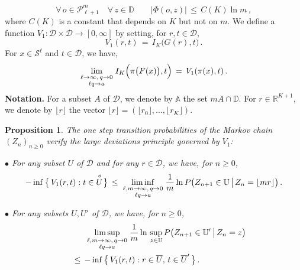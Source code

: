 \documentclass[a4paper,12pt]{article}
\newtheorem{proposition}[theorem]{Proposition}
\theoremstyle{definition}
\theoremstyle{remark}
\def \cD {\mathcal{D}}
\def \cP {\mathcal{P}}
\def \cS {\mathcal{S}}
\def \A {\mathbb{A}}
\def \dD {\mathbb{D}}
\def \R {\mathbb{R}}
\def \dU {\mathbb{U}}
\def \Zt {(Z_n)_{n\geq 0}}
\def \pml {\cP^m_{\ell +1}}
\def\uro{\smash{{U}^{\!\!\!\!\raise5pt\hbox{$\scriptstyle o$}}}}
\begin{document}
$$\forall\, o\in\pml\quad \forall\, z\in\dD\qquad
\big|\Phi(o,z)\big|\,\leq\, C(K)\ln m\,,$$
where
$C(K)$
is a constant that depends on $K$ but not on $m$.
We define a function
$V_1:\cD\times\cD\to [0,\infty]$
by setting, for
$r,t\in\cD$,
$$V_1(r,t)\,=\,
I_K\big(
G(r),t
\big)
\,.$$ 
For $x\in\cS^\ell$ and $t\in\cD$, we have,
$$\lim_{\genfrac{}{}{0pt}{1}{\ell\to\infty,\,q\to0}{\ell q\to a}}
I_K\Big(\pi\big(F(x) \big),t\Big)\,=\,V_1(\pi(x),t)\,.$$
\textbf{Notation.} For a subset $A$ of $\cD$,
we denote by $\A$ the set $mA\cap\dD$.
For $r\in\R^{K+1}$,
we denote by $\lfloor r \rfloor$
the vector 
$\lfloor r\rfloor=(\lfloor r_0\rfloor,\dots,\lfloor r_K\rfloor)$.
\begin{proposition}\label{pgdtrans1}
The one step transition probabilities of the Markov chain  
$\Zt$
verify the large deviations principle governed by
$V_1$:

$\bullet$ For any subset $U$ of $\cD$ and for any $r\in\cD$,
we have, for $n\geq 0$,
$$
-\inf\big\lbrace\,
V_1(r,t):t\in \uro
\,\big\rbrace\,
\leq\,\liminf_{\genfrac{}{}{0pt}{1}{\ell,m\to\infty,\,q\to 0}{{\ell q} \to a}}
\frac{1}{m}\ln P\big( Z_{n+1}\in \dU \,\big|\, Z_n=\lfloor mr  \rfloor \big)\,.%
$$

$\bullet$ For any subsets $U,U'$ of $\cD$,
we have, for $n\geq 0$,
\begin{multline*}
\hspace*{30 pt}\limsup_{\genfrac{}{}{0pt}{1}{\ell,m\to\infty,\,q\to 0}{{\ell q} \to a}}
\frac{1}{m}\ln\, \sup_{z\in \dU} P\big( Z_{n+1}\in \dU' \,\big|\, Z_n=z \big)
\\\leq\,
-\inf\big\lbrace\,
V_1(r,t):
r\in \overline{U},\,
t\in \overline{U}'
\,\big\rbrace\,.\hspace*{40 pt}
\end{multline*}
\end{proposition}
\end{document}
